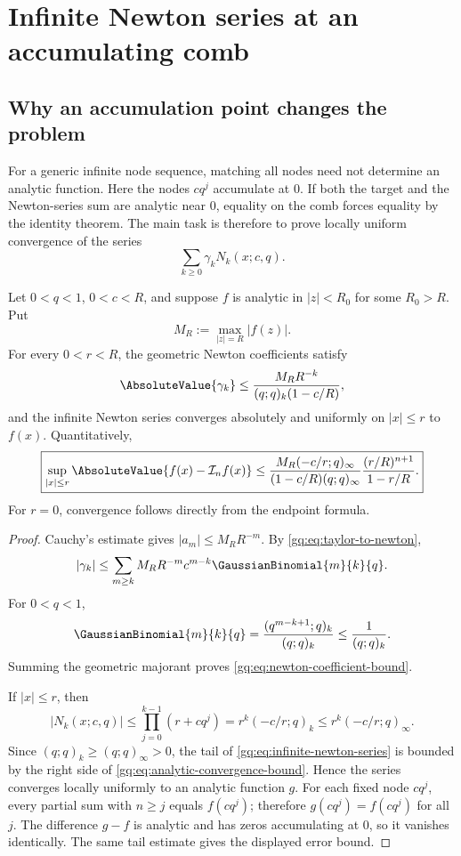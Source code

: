 \section{Infinite Newton series at an accumulating comb}
\label{gq:chap:infinite-newton}

\subsection{Why an accumulation point changes the problem}

For a generic infinite node sequence, matching all nodes need not determine
an analytic function.  Here the nodes $cq^j$ accumulate at $0$.  If both the
target and the Newton-series sum are analytic near $0$, equality on the comb
forces equality by the identity theorem.  The main task is therefore to
prove locally uniform convergence of the series
\begin{equation}
 \sum_{k\ge0}\gamma_kN_k(x;c,q).
 \label{gq:eq:infinite-newton-series}
\end{equation}

\begin{theorem}
\label{gq:thm:analytic-newton-convergence}
Let $0<q<1$, $0<c<R$, and suppose $f$ is analytic in $|z|<R_0$ for some
$R_0>R$.  Put
\[
 M_R:=\max_{|z|=R}|f(z)|.
\]
For every $0<r<R$, the geometric Newton coefficients satisfy
\begin{equation}
 \AbsoluteValue{\gamma_k}
 \le \frac{M_RR^{-k}}{(q;q)_k(1-c/R)},
 \label{gq:eq:newton-coefficient-bound}
\end{equation}
and the infinite Newton series converges absolutely and uniformly on
$|x|\le r$ to $f(x)$.  Quantitatively,
\begin{equation}
 \boxed{
 \sup_{|x|\le r}\AbsoluteValue{f(x)-\Interp_nf(x)}
 \le
 \frac{M_R(-c/r;q)_\infty}
 {(1-c/R)(q;q)_\infty}
 \frac{(r/R)^{n+1}}{1-r/R}.}
 \label{gq:eq:analytic-convergence-bound}
\end{equation}
For $r=0$, convergence follows directly from the endpoint formula.
\end{theorem}

\begin{proof}
Cauchy's estimate gives $|a_m|\le M_RR^{-m}$.  By
\eqref{gq:eq:taylor-to-newton},
\[
 |\gamma_k|
 \le\sum_{m\ge k}M_RR^{-m}c^{m-k}\GaussianBinomial{m}{k}{q}.
\]
For $0<q<1$,
\[
 \GaussianBinomial{m}{k}{q}
 =\frac{(q^{m-k+1};q)_k}{(q;q)_k}
 \le\frac1{(q;q)_k}.
\]
Summing the geometric majorant proves
\eqref{gq:eq:newton-coefficient-bound}.

If $|x|\le r$, then
\[
 |N_k(x;c,q)|
 \le\prod_{j=0}^{k-1}(r+cq^j)
 =r^k(-c/r;q)_k
 \le r^k(-c/r;q)_\infty.
\]
Since $(q;q)_k\ge(q;q)_\infty>0$, the tail of
\eqref{gq:eq:infinite-newton-series} is bounded by the right side of
\eqref{gq:eq:analytic-convergence-bound}.  Hence the series converges locally
uniformly to an analytic function $g$.  For each fixed node $cq^j$, every
partial sum with $n\ge j$ equals $f(cq^j)$; therefore $g(cq^j)=f(cq^j)$ for
all $j$.  The difference $g-f$ is analytic and has zeros accumulating at
$0$, so it vanishes identically.  The same tail estimate gives the displayed
error bound.
\end{proof}


